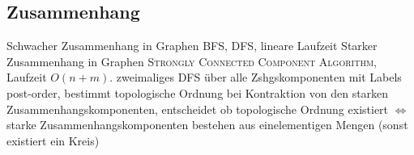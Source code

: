 \subsection{Zusammenhang}
\begin{outline}
    \1 Schwacher Zusammenhang in Graphen 
        \2 BFS, DFS, lineare Laufzeit
    \1 Starker Zusammenhang in Graphen
        \2 \textsc{Strongly Connected Component Algorithm}, Laufzeit $O(n+m)$.
            \3 zweimaliges DFS über alle Zshgskomponenten mit Labels
            \3 post-order,
            \3 bestimmt topologische Ordnung bei Kontraktion von den starken Zusammenhangskomponenten,
            \3 entscheidet ob topologische Ordnung existiert $\iff$ starke Zusammenhangskomponenten bestehen aus einelementigen Mengen (sonst existiert ein Kreis)
\end{outline}

